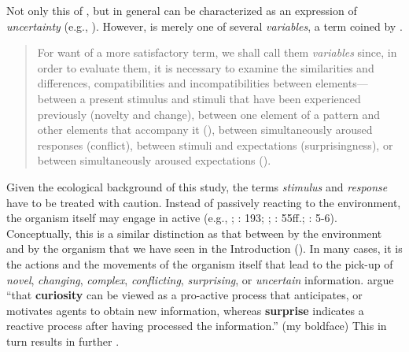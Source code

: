 \noindent Not only this  of , but  in general can be characterized as an expression of \textit{uncertainty} (e.g., \citealt{Schulze2007}). However,  is merely one of several \textit{ variables}, a term coined by \citet[44]{Berlyne1960}.

\begin{quote}
For want of a more satisfactory term, we shall call them \textit{} \textit{variables} since, in order to evaluate them, it is necessary to examine the similarities and differences, compatibilities and incompatibilities between elements—between a present stimulus and stimuli that have been experienced previously (novelty and change), between one element of a pattern and other elements that accompany it (), between simultaneously aroused responses (conflict), between stimuli and expectations (surprisingness), or between simultaneously aroused expectations ().
\end{quote}

\noindent Given the ecological background of this study, the terms \textit{stimulus} and \textit{response} have to be treated with caution. Instead of passively reacting to the environment, the organism itself may engage in active  (e.g., \citealt{Dewey1896}; \citeyear{Dewey1910}: 193; \citealt{Gibson1960}; \citeyear{Gibson1979}: 55ff.; \citealt{Gibson1988}: 5-6). Conceptually, this is a similar distinction as that between \textit{} by the environment and \textit{} by the organism that we have seen in the Introduction (\citealt{Odling-SmeeLaland2009}). In many cases, it is the actions and the movements of the organism itself that lead to the pick-up of \textit{novel}, \textit{changing}, \textit{complex}, \textit{conflicting}, \textit{surprising}, or \textit{uncertain} information. \citet[89]{BaranesaOudeyerGottlieb2015} argue “that \textbf{curiosity} can be viewed as a pro-active process that anticipates, or motivates agents to obtain new information, whereas \textbf{surprise} indicates a reactive process after having processed the information.” (my boldface) This in turn results in further .

